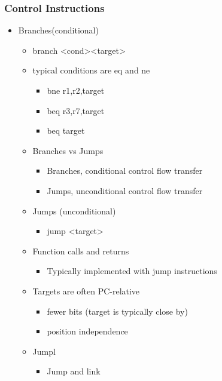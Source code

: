 \documentclass[12pt]{article}
\begin{document}
            \subsubsection{Control Instructions}
                \begin{itemize}
                    \item {Branches(conditional)}
                    \begin{itemize}
                        \item {branch <cond><target>}
                        \item {typical conditions are eq and ne}
                            \begin{itemize}
                                \item {bne r1,r2,target}
                                \item {beq r3,r7,target}
                                \item {beq target}
                            \end{itemize}
                        \item {Branches vs Jumps}
                            \begin{itemize}
                                \item {Branches, conditional control flow transfer}
                                \item {Jumps, unconditional control flow transfer}
                            \end{itemize}
                        \item {Jumps (unconditional)}
                            \begin{itemize}
                                \item {jump <target>}
                            \end{itemize}
                        \item {Function calls and returns}
                            \begin{itemize}
                                \item {Typically implemented with jump instructions}
                            \end{itemize}
                        \item {Targets are often PC-relative}
                            \begin{itemize}
                                \item {fewer bits (target is typically close by)}
                                \item{position independence}
                            \end{itemize}
                        \item {Jumpl}
                            \begin{itemize}
                                \item {Jump and link}
                            \end{itemize}
                    \end{itemize}
                \end{itemize}
\end{document}
